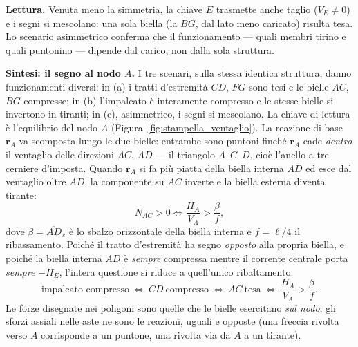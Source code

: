 \begin{esercizio}
\begin{svolgimento}


	
	
%


	
	\medskip\noindent\textbf{Lettura.}
	Venuta meno la simmetria, la chiave $E$ trasmette anche taglio
	($V_E\neq0$) e i segni si mescolano: una sola biella (la $BG$, dal lato meno
	caricato) risulta tesa. Lo scenario asimmetrico conferma che il
	funzionamento --- quali membri tirino e quali puntonino --- dipende dal
	carico, non dalla sola struttura.
	
	
	
	\medskip\noindent\textbf{Sintesi: il segno al nodo $A$.}
	I tre scenari, sulla stessa identica struttura, danno funzionamenti diversi:
	in (a) i tratti d'estremità $CD$, $FG$ sono tesi e le bielle $AC$, $BG$
	compresse; in (b) l'impalcato è interamente compresso e le stesse bielle si
	invertono in tiranti; in (c), asimmetrico, i segni si mescolano. La chiave di
	lettura è l'equilibrio del nodo $A$ (Figura~\ref{fig:stampella_ventaglio}).
	La reazione di base $\mathbf r_A$ va scomposta lungo le due bielle: entrambe
	sono puntoni finché $\mathbf r_A$ cade \emph{dentro} il ventaglio delle
	direzioni $AC$, $AD$ --- il triangolo $A$--$C$--$D$, cioè l'anello a tre
	cerniere d'imposta. Quando $\mathbf r_A$ si fa più piatta della biella interna
	$AD$ ed esce dal ventaglio oltre $AD$, la componente su $AC$ inverte e la
	biella esterna diventa tirante:
	\[
	N_{AC}>0 \iff \frac{H_A}{V_A} > \frac{\beta}{f},
	\]
	dove $\beta=\overline{AD}_x$ è lo sbalzo orizzontale della biella interna e
	$f=\ell/4$ il ribassamento. Poiché il tratto d'estremità ha segno
	\emph{opposto} alla propria biella, e poiché la biella interna $AD$ è
	\emph{sempre} compressa mentre il corrente centrale porta \emph{sempre}
	$-H_E$, l'intera questione si riduce a quell'unico ribaltamento:
	\[
	\text{impalcato compresso}\ \iff\ CD\ \text{compresso}\ \iff\ AC\ \text{tesa}\ \iff\ \frac{H_A}{V_A}>\frac{\beta}{f}.
	\]
	Le forze disegnate nei poligoni sono quelle che le bielle esercitano \emph{sul
	nodo}; gli sforzi assiali nelle aste ne sono le reazioni, uguali e opposte
	(una freccia rivolta verso $A$ corrisponde a un puntone, una rivolta via da
	$A$ a un tirante).
	

\end{svolgimento}
\end{esercizio}
